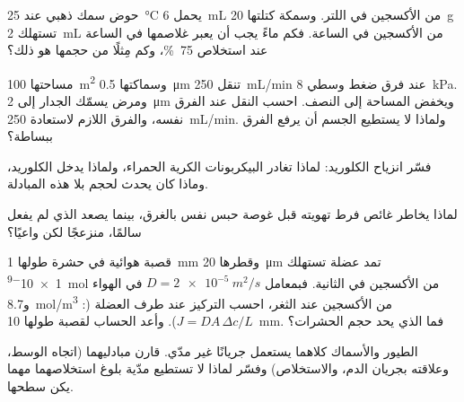 \begin{exercise}[$\star\star$]\label{exo:b1:gas-exchange:6}
حوض سمك ذهبي عند \qty{25}{\celsius} يحمل \qty{6}{mL} من الأكسجين
في اللتر. وسمكة كتلتها \qty{20}{g} تستهلك \qty{2}{mL} من الأكسجين
في الساعة. فكم ماءً يجب أن يعبر غلاصمها في الساعة عند استخلاص
\qty{75}{\%}، وكم مِثلًا من حجمها هو ذلك؟
\end{exercise}

\begin{exercise}[$\star\star$]\label{exo:b1:gas-exchange:7}
 مساحتها \qty{100}{m^2} وسماكتها \qty{0.5}{\micro m} تنقل
\qty{250}{mL/min} عند فرق ضغط وسطي \qty{8}{kPa}. ومرض يسمّك
الجدار إلى \qty{2}{\micro m} ويخفض المساحة إلى النصف. احسب النقل
عند الفرق نفسه، والفرق اللازم لاستعادة \qty{250}{mL/min}. ولماذا
لا يستطيع الجسم أن يرفع الفرق ببساطة؟
\end{exercise}

\begin{exercise}[$\star\star$]\label{exo:b1:gas-exchange:8}
فسّر انزياح الكلوريد: لماذا تغادر البيكربونات الكرية الحمراء،
ولماذا يدخل الكلوريد، وماذا كان يحدث لحجم  بلا هذه المبادلة.
\end{exercise}

\begin{exercise}[$\star\star$]\label{exo:b1:gas-exchange:9}
لماذا يخاطر غائص فرط تهويته قبل غوصة حبس نفس بالغرق، بينما يصعد
الذي لم يفعل سالمًا، منزعجًا لكن واعيًا؟
\end{exercise}

\begin{exercise}[$\star\star\star$]\label{exo:b1:gas-exchange:10}
قصبة هوائية في حشرة طولها \qty{1}{mm} وقطرها \qty{20}{\micro m}
تمد عضلة تستهلك \qty{1e-9}{mol} من الأكسجين في الثانية. فبمعامل
$D = \qty{2e-5}{m^2/s}$ في الهواء و\qty{8.7}{mol/m^3} من الأكسجين
عند الثغر، احسب التركيز عند طرف العضلة (:
$J = DA\,\Delta c/L$). وأعد الحساب لقصبة طولها \qty{10}{mm}. فما
الذي يحد حجم الحشرات؟
\end{exercise}

\begin{exercise}[$\star\star\star$]\label{exo:b1:gas-exchange:11}
الطيور والأسماك كلاهما يستعمل جريانًا غير مدّي. قارن مبادليهما
(اتجاه الوسط، وعلاقته بجريان الدم، والاستخلاص) وفسّر لماذا لا
تستطيع  مدّية بلوغ استخلاصهما مهما يكن سطحها.
\end{exercise}

